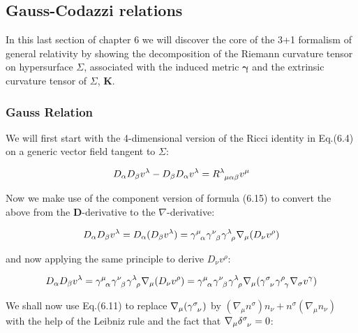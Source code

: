 \documentclass[12pt]{article}
\renewcommand{\vec}[1]{\bm{#1}}
\numberwithin{equation}{section}
\numberwithin{theorem}{subsection}
\begin{document}
\subsection{Gauss-Codazzi relations}

In this last section of chapter 6 we will discover the core of the 3+1 formalism of general relativity by showing the decomposition of the Riemann curvature tensor on hypersurface $\Sigma$, associated with the induced metric $\vec{\gamma}$ and the extrinsic curvature tensor of $\Sigma$, $\vec{K}$.

\subsubsection{Gauss Relation}

We will first start with the 4-dimensional version of the Ricci identity in Eq.(6.4) on a generic vector field tangent to $\Sigma$:

\begin{equation}

    D_{\alpha}D_{\beta}v^{\lambda} - D_{\beta}D_{\alpha}v^{\lambda} = \tensor{R}{^\lambda_\mu_\alpha_\beta}v^{\mu}

    \end{equation}

Now we make use of the component version of formula (6.15) to convert the above from the $\vec{D}$-derivative to the $\nabla$-derivative:

\[

D_{\alpha}D_{\beta}v^{\lambda} = D_{\alpha}(D_{\beta}v^{\lambda}) = \tensor{\gamma}{^\mu_\alpha}\tensor{\gamma}{^\nu_\beta}\tensor{\gamma}{^\lambda_\rho}\nabla_{\mu}(D_{\nu}v^{\rho})

\]

and now applying the same principle to derive $D_{\nu}v^{\rho}$:

\[

D_{\alpha}D_{\beta}v^{\lambda}  = \tensor{\gamma}{^\mu_\alpha}\tensor{\gamma}{^\nu_\beta}\tensor{\gamma}{^\lambda_\rho}\nabla_{\mu}(D_{\nu}v^{\rho}) = \tensor{\gamma}{^\mu_\alpha}\tensor{\gamma}{^\nu_\beta}\tensor{\gamma}{^\lambda_\rho}\nabla_{\mu}(\tensor{\gamma}{^\sigma_\nu}\tensor{\gamma}{^\rho_\gamma}\nabla_{\sigma}v^{\gamma})

\]

We shall now use Eq.(6.11) to replace $\nabla_{\mu}(\tensor{\gamma}{^\sigma_\nu})$ by $(\nabla_{\mu}n^{\sigma})n_{\nu} + n^{\sigma}(\nabla_{\mu}n_{\nu})$ with the help of the Leibniz rule and the fact that $\nabla_{\mu}\tensor{\delta}{^\sigma_\nu}=0$:
\end{document}
